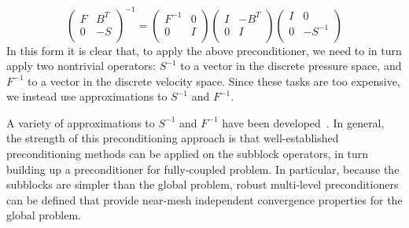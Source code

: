 \documentclass[acmtoms,acmnow]{acmtrans2m}
\begin{document}
\begin{equation}
\label{eq:blockfactor2}
\left(\begin{array}{cc}
	F & B^T \\
	0  &-S \\
\end{array}\right)^{-1}
=
\left(\begin{array}{cc}
F^{-1} & 0 \\
0      & I \\
\end{array}\right)
\left(\begin{array}{cc}
I & -B^T \\
0  & I \\
\end{array}\right)
\left(\begin{array}{cc}
I & 0 \\
0  & -S^{-1} \\
\end{array}\right)
\end{equation}
In this form it is clear that, to apply the above
preconditioner, we need to in turn apply two nontrivial operators:
$S^{-1}$ to a vector in the discrete pressure space, and $F^{-1}$ to a
vector in the discrete velocity space.  Since these tasks are too
expensive, we instead use approximations to $S^{-1}$ and
$F^{-1}$.

A variety of approximations to $S^{-1}$ and $F^{-1}$ have been
developed~\cite{ElmaHowlShadTumi2003}.  In general,
the strength of this preconditioning approach is that
well-established preconditioning methods can be applied on the
subblock operators, in turn building up a preconditioner for
fully-coupled problem.  In particular, because the subblocks are
simpler than the global problem, robust multi-level preconditioners
can be defined that provide near-mesh independent convergence
properties for the global problem.
\end{document}
